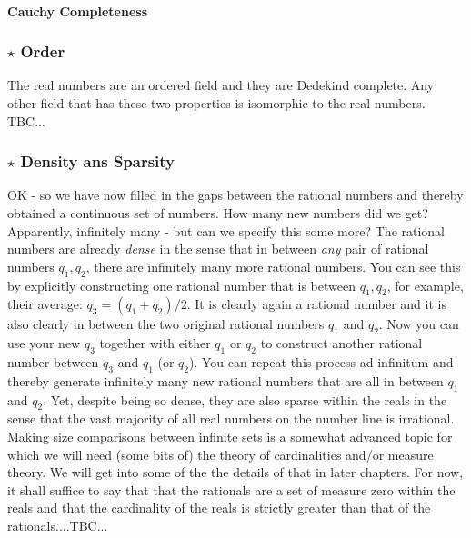 

\paragraph{Cauchy Completeness}

\subsubsection{$\star$ Order}
The real numbers are an ordered field and they are Dedekind complete. Any other field that has these two properties is isomorphic to the real numbers. TBC...



\subsubsection{$\star$ Density ans Sparsity}
OK - so we have now filled in the gaps between the rational numbers and thereby obtained a continuous set of numbers. How many new numbers did we get? Apparently, infinitely many - but can we specify this some more? The rational numbers are already \emph{dense} in the sense that in between \emph{any} pair of rational numbers $q_1, q_2$, there are infinitely many more  rational numbers. You can see this by explicitly constructing one rational number that is between $q_1, q_2$, for example, their average: $q_3 = (q_1 + q_2) / 2$. It is clearly again a rational number and it is also clearly in between the two original rational numbers $q_1$ and $q_2$. Now you can use your new $q_3$ together with either $q_1$ or $q_2$ to construct another rational number between $q_3$ and $q_1$ (or $q_2$). You can repeat this process ad infinitum and thereby generate infinitely many new rational numbers that are all in between $q_1$ and $q_2$. Yet, despite being so dense, they are also sparse within the reals in the sense that the vast majority of all  real numbers on the number line is irrational. Making size comparisons between infinite sets is a somewhat advanced topic for which we will need (some bits of) the theory of cardinalities and/or measure theory. We will get into some of the the details of that in later chapters. For now, it shall suffice to say that that the rationals are a set of measure zero within the reals and that the cardinality of the reals is strictly greater than that of the rationals....TBC...

